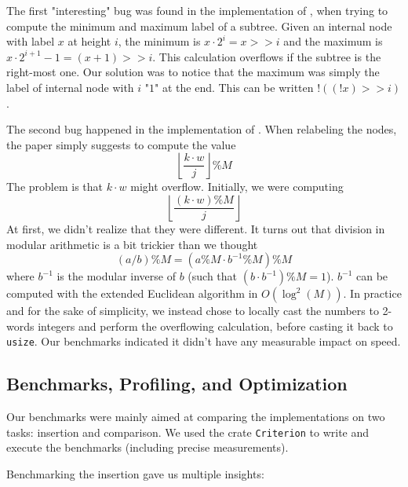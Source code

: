 \documentclass[12pt]{article}
\begin{document}
The first "interesting" bug was found in the implementation of \cite{10.5555/647912.740822}, when trying to compute the minimum and maximum label of a subtree. Given an internal node with label $x$ at height $i$, the minimum is $x \cdot 2^i = x >> i$ and the maximum is $x \cdot 2^{i+1} - 1 = (x + 1) >> i$. This calculation overflows if the subtree is the right-most one. Our solution was to notice that the maximum was simply the label of internal node with $i$ "$1$" at the end. This can be written $!((!x) >> i) $.

The second bug happened in the implementation of \cite{10.1145/28395.28434}. When relabeling the nodes, the paper simply suggests to compute the value
$$\left\lfloor \frac{k \cdot w}{j} \right\rfloor \% M$$
The problem is that  $k\cdot w$ might overflow. Initially, we were computing
$$\left\lfloor \frac{(k \cdot w) \% M}{j} \right\rfloor$$
At first, we didn't realize that they were different. It turns out that division in modular arithmetic is a bit trickier than we thought
$$(a/b)\%M = (a\%M \cdot b^{-1}\%M)\%M $$
where $b^{-1}$ is the modular inverse of $b$ (such that $(b \cdot b^{-1}) \%M = 1$).
$b^{-1}$ can be computed with the extended Euclidean algorithm in $O(\log^2(M))$. In practice and for the sake of simplicity, we instead chose to locally cast the numbers to 2-words integers and perform the overflowing calculation, before casting it back to \texttt{usize}. Our benchmarks indicated it didn't have any measurable impact on speed.

\subsection{Benchmarks, Profiling, and Optimization}

Our benchmarks were mainly aimed at comparing the implementations on two tasks: insertion and comparison. We used the crate \texttt{Criterion} \cite{criterion-crate} to write and execute the benchmarks (including precise measurements).

Benchmarking the insertion gave us multiple insights:
\end{document}
